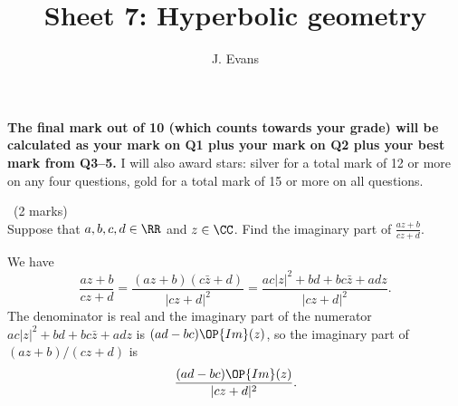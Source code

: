 \documentclass[12pt]{article}
\title{Sheet 7: Hyperbolic geometry}
\author{J. Evans}
\date{}
\begin{document}
\maketitle

\bigskip

{\bf The final mark out of 10 (which counts towards your grade) will be calculated as your mark on Q1 plus your mark on Q2 plus your best mark from Q3--5.} I will also award stars: silver for a total mark of 12 or more on any four questions, gold for a total mark of 15 or more on all questions.

\vspace{1cm}

\begin{question}\ (2 marks)\\
  Suppose that $a,b,c,d\in\RR$ and $z\in\CC$. Find the imaginary part of $\frac{az+b}{cz+d}$.
\end{question}

\begin{answer}
  We have
  \[\frac{az+b}{cz+d}=\frac{(az+b)(c\bar{z}+d)}{|cz+d|^2}=\frac{ac|z|^2+bd+bc\bar{z}+adz}{|cz+d|^2}.\]
  The denominator is real and the imaginary part of the numerator $ac|z|^2+bd+bc\bar{z}+adz$ is $(ad-bc)\OP{Im}(z)$, so the imaginary part of $(az+b)/(cz+d)$ is
  \[\frac{(ad-bc)\OP{Im}(z)}{|cz+d|^2}.\]
\end{answer}
\newpage

\vspace{1cm}
\end{document}
